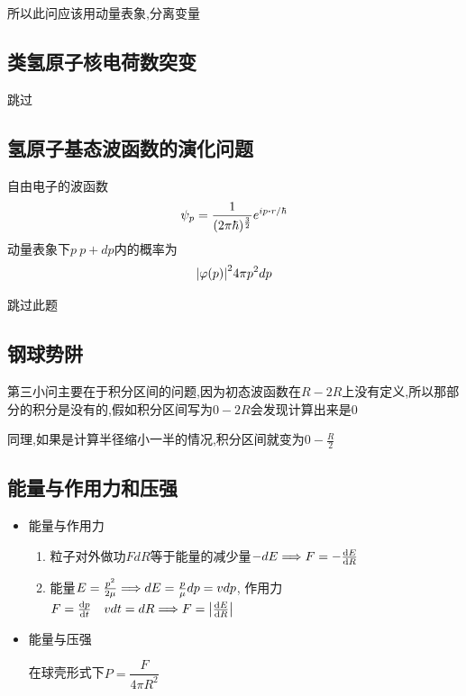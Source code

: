 \documentclass{article}
\begin{document}
            所以此问应该用动量表象,分离变量

        \subsection{类氢原子核电荷数突变}
            跳过

        \subsection{氢原子基态波函数的演化问题}
            自由电子的波函数
            $$ \psi_{p} = \frac{1}{(2\pi \hbar)^{\frac{3}{2 }}} e^{ip \vdot r/\hbar} $$
            动量表象下$p~p+dp$内的概率为
            $$ \abs{\varphi(p)}^{2} 4\pi p^{2} dp $$

            跳过此题

        \subsection{钢球势阱}
            第三小问主要在于积分区间的问题,因为初态波函数在$R-2R$上没有定义,所以那部分的积分是没有的,假如积分区间写为$0-2R$会发现计算出来是0

            同理,如果是计算半径缩小一半的情况,积分区间就变为$0-\frac{R}{2}$

        \subsection{能量与作用力和压强}
            \begin{formal}
                \begin{itemize}
                    \item 能量与作用力
                    \begin{enumerate}
                        \item 粒子对外做功$ F dR $等于能量的减少量$ - dE \Longrightarrow F = - \dv{E}{R}$
                        \item 能量$ E = \frac{p^{2}}{2\mu} \Longrightarrow dE = \frac{p}{\mu} dp = v dp $,
                        作用力$ F = \dv{p}{t}  \quad v dt = dR \Longrightarrow F = \abs{\dv{E}{R}}$
                    \end{enumerate}
                    \item 能量与压强 
                    
                    在球壳形式下$ P = \dfrac{F}{4\pi R^{2}} $
                \end{itemize}
            \end{formal}
\end{document}
